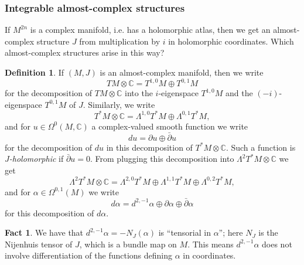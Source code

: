 \documentclass{article}
\theoremstyle{definition}
\newtheorem*{definition}{Definition}
\newtheorem*{fact}{Fact}
\newcommand{\C}{\mathbb{C}}
\begin{document}
\subsubsection*{Integrable almost-complex structures}

If $M^{2n}$ is a complex manifold, i.e. has a holomorphic atlas, then we get an
almost-complex structure $J$ from multiplication by $i$ in holomorphic
coordinates. Which almost-complex structures arise in this way?

\begin{definition}
    If $(M,J)$ is an almost-complex manifold, then we write
    \begin{equation*}
        TM\otimes\C = T^{1,0}M\oplus T^{0,1}M
    \end{equation*}
    for the decomposition of $TM\otimes\C$ into the $i$-eigenspace $T^{1,0}M$
    and the $(-i)$-eigenspace $T^{0,1}M$ of $J$. Similarly, we write
    \begin{equation*}
        T^*M\otimes\C = \Lambda^{1,0}T^*M\oplus\Lambda^{0,1}T^*M,
    \end{equation*}
    and for $u\in\Omega^0(M,\C)$ a complex-valued smooth function we write
    \begin{equation*}
        du = \partial u\oplus\bar\partial u
    \end{equation*}
    for the decomposition of $du$ in this decomposition of $T^*M\otimes\C$. Such
    a function is \emph{$J$-holomorphic} if $\bar\partial u=0$. From plugging
    this decomposition into $\Lambda^2T^*M\otimes\C$ we get
    \begin{equation*}
        \Lambda^2T^*M\otimes\C
            = \Lambda^{2,0}T^*M\oplus\Lambda^{1,1}T^*M\oplus\Lambda^{0,2}T^*M,
    \end{equation*}
    and for $\alpha\in\Omega^{0,1}(M)$ we write
    \begin{equation*}
        d\alpha = d^{2,-1}\alpha\oplus\partial\alpha\oplus\bar\partial\alpha
    \end{equation*}
    for this decomposition of $d\alpha$.
\end{definition}

\begin{fact}
    We have that $d^{2,-1}\alpha=-N_J(\alpha)$ is ``tensorial in $\alpha$'';
    here $N_J$ is the Nijenhuis tensor of $J$, which is a bundle map on $M$.
    This means $d^{2,-1}\alpha$ does not involve differentiation of the
    functions defining $\alpha$ in coordinates.
\end{fact}
\end{document}
